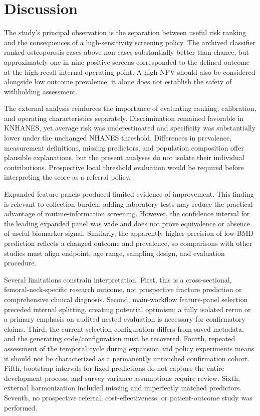\documentclass[11pt,a4paper]{article}
\begin{document}
\section{Discussion}
The study's principal observation is the separation between useful risk ranking and the consequences of a high-sensitivity screening policy. The archived classifier ranked osteoporosis cases above non-cases substantially better than chance, but approximately one in nine positive screens corresponded to the defined outcome at the high-recall internal operating point. A high NPV should also be considered alongside low outcome prevalence; it alone does not establish the safety of withholding assessment.

The external analysis reinforces the importance of evaluating ranking, calibration, and operating characteristics separately. Discrimination remained favorable in KNHANES, yet average risk was underestimated and specificity was substantially lower under the unchanged NHANES threshold. Differences in prevalence, measurement definitions, missing predictors, and population composition offer plausible explanations, but the present analyses do not isolate their individual contributions. Prospective local threshold evaluation would be required before interpreting the score as a referral policy.

Expanded feature panels produced limited evidence of improvement. This finding is relevant to collection burden: adding laboratory tests may reduce the practical advantage of routine-information screening. However, the confidence interval for the leading expanded panel was wide and does not prove equivalence or absence of useful biomarker signal. Similarly, the apparently higher precision of low-BMD prediction reflects a changed outcome and prevalence, so comparisons with other studies must align endpoint, age range, sampling design, and evaluation procedure.

Several limitations constrain interpretation. First, this is a cross-sectional, femoral-neck-specific research outcome, not prospective fracture prediction or comprehensive clinical diagnosis. Second, main-workflow feature-panel selection preceded internal splitting, creating potential optimism; a fully isolated rerun or a primary emphasis on audited nested evaluation is necessary for confirmatory claims. Third, the current selection configuration differs from saved metadata, and the generating code/configuration must be recovered. Fourth, repeated assessment of the temporal cycle during expansion and policy experiments means it should not be characterized as a permanently untouched confirmation cohort. Fifth, bootstrap intervals for fixed predictions do not capture the entire development process, and survey variance assumptions require review. Sixth, external harmonization included missing and imperfectly matched predictors. Seventh, no prospective referral, cost-effectiveness, or patient-outcome study was performed.
\end{document}
